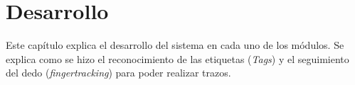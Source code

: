 \chapter{Desarrollo}

Este capítulo explica el desarrollo del sistema en cada uno de los módulos. 
Se explica como se hizo el reconocimiento de las etiquetas ({\it Tags}) y el seguimiento del dedo ({\it fingertracking}) 
para poder realizar trazos.

